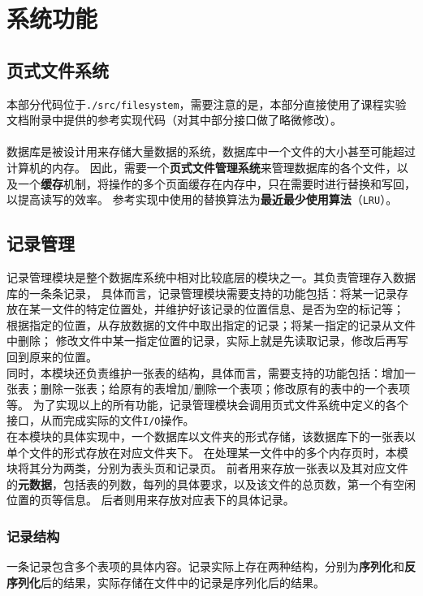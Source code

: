 \documentclass[11pt]{article}
\begin{document}
\section{系统功能}
\subsection{页式文件系统}
本部分代码位于\texttt{./src/filesystem}，需要注意的是，本部分直接使用了课程实验文档附录中提供的参考实现代码（对其中部分接口做了略微修改）。\\\\
数据库是被设计用来存储大量数据的系统，数据库中一个文件的大小甚至可能超过计算机的内存。
因此，需要一个\textbf{页式文件管理系统}来管理数据库的各个文件，以及一个\textbf{缓存}机制，将操作的多个页面缓存在内存中，只在需要时进行替换和写回，以提高读写的效率。
参考实现中使用的替换算法为\textbf{最近最少使用算法}（\texttt{LRU}）。

\subsection{记录管理}
记录管理模块是整个数据库系统中相对比较底层的模块之一。其负责管理存入数据库的一条条记录，
具体而言，记录管理模块需要支持的功能包括：将某一记录存放在某一文件的特定位置处，并维护好该记录的位置信息、是否为空的标记等；
根据指定的位置，从存放数据的文件中取出指定的记录；将某一指定的记录从文件中删除；
修改文件中某一指定位置的记录，实际上就是先读取记录，修改后再写回到原来的位置。\\

同时，本模块还负责维护一张表的结构，具体而言，需要支持的功能包括：增加一张表；删除一张表；给原有的表增加/删除一个表项；修改原有的表中的一个表项等。
为了实现以上的所有功能，记录管理模块会调用页式文件系统中定义的各个接口，从而完成实际的文件\texttt{I/O}操作。\\

在本模块的具体实现中，一个数据库以文件夹的形式存储，该数据库下的一张表以单个文件的形式存放在对应文件夹下。 
在处理某一文件中的多个内存页时，本模块将其分为两类，分别为表头页和记录页。
前者用来存放一张表以及其对应文件的\textbf{元数据}，包括表的列数，每列的具体要求，以及该文件的总页数，第一个有空闲位置的页等信息。
后者则用来存放对应表下的具体记录。

\subsubsection{记录结构}
一条记录包含多个表项的具体内容。记录实际上存在两种结构，分别为\textbf{序列化}和\textbf{反序列化}后的结果，实际存储在文件中的记录是序列化后的结果。
\end{document}
